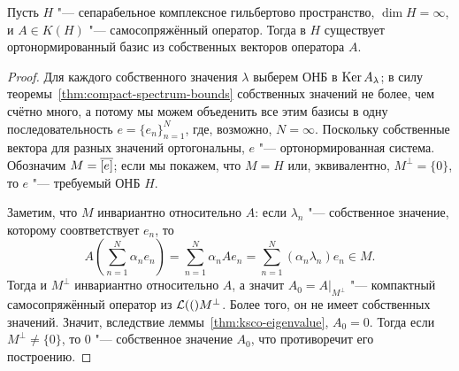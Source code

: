 \documentclass[main]{subfiles}
\begin{document}
\begin{theorem}
  Пусть \( H \) "--- сепарабельное комплексное гильбертово пространство,
  \( \dim H = \infty \), и
  \( A \in K(H) \) "--- самосопряжённый оператор.
  Тогда в \( H \) существует ортонормированный базис
  из собственных векторов оператора \( A \).
\end{theorem}
\begin{proof}
  Для каждого собственного значения \( \lambda \)
  выберем ОНБ в \( \operatorname{Ker} A_\lambda \);
  в силу теоремы~\ref{thm:compact-spectrum-bounds}
  собственных значений не более, чем счётно много,
  а потому мы можем объеденить все этим базисы
  в одну последовательность \( e = \{ e_n \}_{n=1}^N \),
  где, возможно, \( N = \infty \).
  Поскольку собственные вектора для разных значений
  ортогональны, \( e \) "--- ортонормированная система.
  Обозначим \( M = \overline{[e]} \);
  если мы покажем, что \( M = H \) или,
  эквивалентно, \( M^\perp = \{ 0 \} \),
  то \( e \) "--- требуемый ОНБ \( H \).

  Заметим, что \( M \) инвариантно относительно \( A \):
  если \( \lambda_n \) "--- собственное значение,
  которому соовтветствует \( e_n \), то
  \[
    A (\sum_{n=1}^N \alpha_n e_n) =
    \sum_{n=1}^N \alpha_n A e_n =
    \sum_{n=1}^N (\alpha_n \lambda_n) e_n \in M.
  \]
  Тогда и \( M^\perp \) инвариантно относительно \( A \),
  а значит \( A_0 = A \bigr|_{M^\perp} \) "---
  компактный самосопряжённый оператор из \( \Linears(M^\perp \).
  Более того, он не имеет собственных значений.
  Значит, вследствие леммы~\ref{thm:ksco-eigenvalue},
  \( A_0 = 0 \).
  Тогда если \( M^\perp \ne \{ 0 \} \), то \( 0 \) "---
  собственное значение \( A_0 \),
  что противоречит его построению.
\end{proof}
\end{document}
